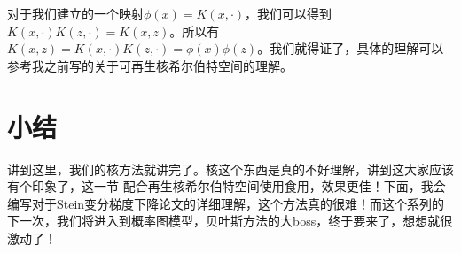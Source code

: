 \documentclass[a4paper]{article}
\begin{document}
对于我们建立的一个映射$\phi(x)= K(x,\cdot)$，我们可以得到$K(x,\cdot)K(z,\cdot) = K(x,z)$。所以有$K(x,z) = K(x,\cdot)K(z,\cdot) = \phi(x)\phi(z)$。我们就得证了，具体的理解可以参考我之前写的关于可再生核希尔伯特空间的理解。

\section{小结}
讲到这里，我们的核方法就讲完了。核这个东西是真的不好理解，讲到这大家应该有个印象了，这一节{\color{red} 配合再生核希尔伯特空间使用食用，效果更佳！}下面，我会编写对于Stein变分梯度下降论文的详细理解，这个方法真的很难！而这个系列的下一次，我们将进入到概率图模型，贝叶斯方法的大boss，终于要来了，想想就很激动了！
\end{document}
